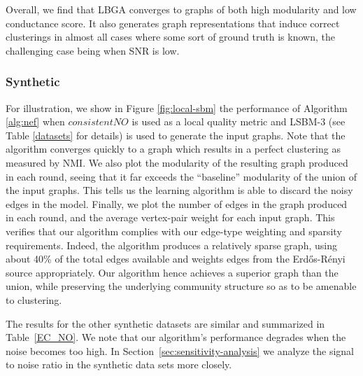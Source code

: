 \documentclass{IEEEtran}
\newcommand{\er}{Erd\H{o}s-R\'{e}nyi }
\begin{document}
Overall, we find that LBGA converges to graphs of both high modularity and low
conductance score. It also generates graph representations that induce correct
clusterings in almost all cases where some sort of ground truth is known, the
challenging case being when SNR is low. 

\subsubsection{Synthetic}
For illustration, we show in Figure \ref{fig:local-sbm} the performance of
Algorithm \ref{alg:nef} when $consistentNO$ is used as a local quality metric
and LSBM-3 (see Table \ref{datasets} for details) is used to generate the input
graphs. Note that the algorithm converges quickly to a graph which results in a
perfect clustering as measured by NMI. We also plot the modularity of the
resulting graph produced in each round, seeing that it far exceeds the
``baseline'' modularity of the union of the input graphs. This tells us the
learning algorithm is able to discard the noisy edges in the model. Finally, we
plot the number of edges in the graph produced in each round, and the average
vertex-pair weight for each input graph. This verifies that our algorithm
complies with our edge-type weighting and sparsity requirements. Indeed, the
algorithm produces a relatively sparse graph, using about 40\% of the total
edges available and weights edges from the \er source appropriately.  Our
algorithm hence achieves a superior graph than the union, while preserving the
underlying community structure so as to be amenable to clustering. 

The results for the other synthetic datasets are similar and summarized in
Table~\ref{EC_NO}. We note that our algorithm's performance degrades when the
noise becomes too high. In Section~\ref{sec:sensitivity-analysis} we analyze
the signal to noise ratio in the synthetic data sets more closely.
\end{document}
